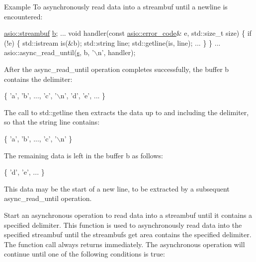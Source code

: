 \begin{DoxyParagraph}{Example}
To asynchronously read data into a streambuf until a newline is encountered\+: 
\begin{DoxyCode}
 \hyperlink{classasio_1_1basic__streambuf}{asio::streambuf} \hyperlink{group__async__read_ga945a5c18fa77a9e2eba420f8f44b2a4f}{b};
...
void handler(\textcolor{keyword}{const} \hyperlink{classasio_1_1error__code}{asio::error\_code}& e, std::size\_t size)
\{
  \textcolor{keywordflow}{if} (!e)
  \{
    std::istream is(&b);
    std::string line;
    std::getline(is, line);
    ...
  \}
\}
...
asio::async\_read\_until(\hyperlink{group__async__connect_ga31ab74b9ea6c77932dddd016cfc7920a}{s}, b, \textcolor{charliteral}{'\(\backslash\)n'}, handler); 
\end{DoxyCode}
 After the {\ttfamily async\+\_\+read\+\_\+until} operation completes successfully, the buffer {\ttfamily b} contains the delimiter\+: 
\begin{DoxyCode}
\{ \textcolor{charliteral}{'a'}, \textcolor{charliteral}{'b'}, ..., \textcolor{charliteral}{'c'}, \textcolor{charliteral}{'\(\backslash\)n'}, \textcolor{charliteral}{'d'}, \textcolor{charliteral}{'e'}, ... \} 
\end{DoxyCode}
 The call to {\ttfamily std\+::getline} then extracts the data up to and including the delimiter, so that the string {\ttfamily line} contains\+: 
\begin{DoxyCode}
\{ \textcolor{charliteral}{'a'}, \textcolor{charliteral}{'b'}, ..., \textcolor{charliteral}{'c'}, \textcolor{charliteral}{'\(\backslash\)n'} \} 
\end{DoxyCode}
 The remaining data is left in the buffer {\ttfamily b} as follows\+: 
\begin{DoxyCode}
\{ \textcolor{charliteral}{'d'}, \textcolor{charliteral}{'e'}, ... \} 
\end{DoxyCode}
 This data may be the start of a new line, to be extracted by a subsequent {\ttfamily async\+\_\+read\+\_\+until} operation.
\end{DoxyParagraph}
Start an asynchronous operation to read data into a streambuf until it contains a specified delimiter. This function is used to asynchronously read data into the specified streambuf until the streambuf\textquotesingle{}s get area contains the specified delimiter. The function call always returns immediately. The asynchronous operation will continue until one of the following conditions is true\+:

